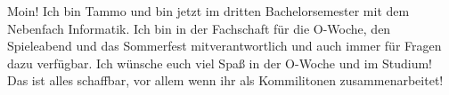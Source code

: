 \begin{multicols}{2}
{
Moin! Ich bin Tammo und bin jetzt im dritten Bachelorsemester mit dem Nebenfach Informatik. Ich bin in der Fachschaft für die O-Woche, den Spieleabend und das Sommerfest mitverantwortlich und auch immer für Fragen dazu verfügbar. Ich wünsche euch viel Spaß in der O-Woche und im Studium! Das ist alles schaffbar, vor allem wenn ihr als Kommilitonen zusammenarbeitet!
}


\end{multicols}
